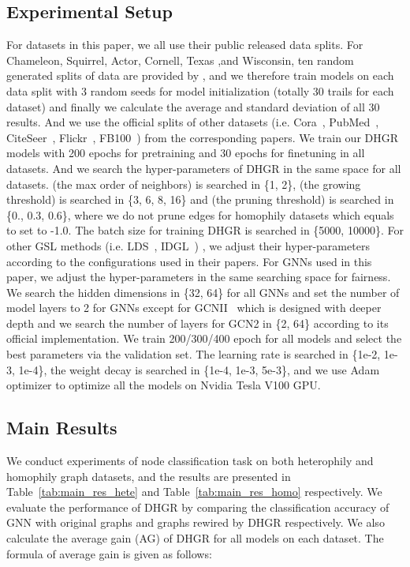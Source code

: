 \documentclass[sigconf]{acmart}
\begin{document}
	\subsection{Experimental Setup}
	For datasets in this paper, we all use their public released data splits. For Chameleon, Squirrel, Actor, Cornell, Texas ,and Wisconsin, ten random generated splits of data are provided by \cite{pei2020geom}, and we therefore train models on each data split with 3 random seeds for model initialization (totally 30 trails for each dataset) and finally we calculate the average and standard deviation of all 30 results. And we use the official splits of other datasets (i.e. Cora~\cite{GCN}, PubMed~\cite{GCN}, CiteSeer~\cite{GCN}, Flickr~\cite{zeng2019graphsaint}, FB100~\cite{lim2021new}) from the corresponding papers. We train our DHGR models with 200 epochs for pretraining and 30 epochs for finetuning in all datasets. And we search the hyper-parameters of DHGR in the same space for all datasets.  (the max order of neighbors) is searched in \{1, 2\},  (the growing threshold) is searched in \{3, 6, 8, 16\} and  (the pruning threshold) is searched in \{0., 0.3, 0.6\}, where we do not prune edges for homophily datasets which equals to set  to -1.0. The batch size for training DHGR is searched in \{5000, 10000\}. For other GSL methods (i.e. LDS~\cite{LDS}, IDGL~\cite{chen2020iterative}) , we adjust their hyper-parameters according to the configurations used in their papers. For GNNs used in this paper, we adjust the hyper-parameters in the same searching space for fairness. We search the hidden dimensions in \{32, 64\} for all GNNs and set the number of model layers to 2 for GNNs except for GCNII~\cite{GCN2} which is designed with deeper depth and we search the number of layers for GCN2 in \{2, 64\} according to its official implementation. We train 200/300/400 epoch for all models and select the best parameters via the validation set.  The learning rate is searched in \{1e-2, 1e-3, 1e-4\}, the weight decay is searched in \{1e-4, 1e-3, 5e-3\}, and we use Adam optimizer to optimize all the models on Nvidia Tesla V100 GPU. 

	\subsection{Main Results}
	\label{sec:main_res}
	We conduct experiments of node classification task on both heterophily and homophily graph datasets, and the results are presented in Table~\ref{tab:main_res_hete} and Table~\ref{tab:main_res_homo} respectively. We evaluate the performance of DHGR by comparing the classification accuracy of GNN with original graphs and graphs rewired by DHGR respectively. We also calculate the average gain (AG) of DHGR for all models on each dataset. The formula of average gain is given as follows:
	
\end{document}
